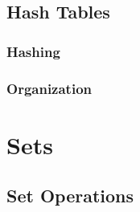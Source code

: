 
\subsection{Hash Tables}

\subsubsection{Hashing}

\subsubsection{Organization}

\csharpsubsection{\csharp}

\section{Sets}

\subsection{Set Operations}

\csharpsubsection{\csharp}




